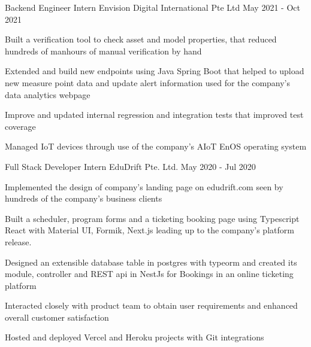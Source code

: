 

\begin{cventries}

  \cventry
    {Backend Engineer Intern} %
    {Envision Digital International Pte Ltd} %
    {} %
    {May 2021 - Oct 2021} %
    {
      \begin{cvitems} %
        \item {Built a verification tool to check asset and model properties, that reduced hundreds of manhours of manual verification by hand}
        \item {Extended and build new endpoints using Java Spring Boot that helped to upload new measure point data and update alert information used for the company's data analytics webpage}
        \item {Improve and updated internal regression and integration tests that improved test coverage}
        \item {Managed IoT devices through use of the company's AIoT EnOS operating system}
      \end{cvitems}
    }

  \cventry
    {Full Stack Developer Intern} %
    {EduDrift Pte. Ltd.} %
    {} %
    {May 2020 - Jul 2020} %
    {
      \begin{cvitems} %
        \item {Implemented the design of company's landing page on \textcolor{eduDft-darkblue}{edudrift.com} seen by hundreds of the company's business clients}
        \item {Built a scheduler, program forms and a ticketing booking page using Typescript React with Material UI, Formik, Next.js leading up to the company's platform release.}
        \item {Designed an extensible database table in postgres with typeorm and created its module, controller and REST api in NestJs for Bookings in an online ticketing platform}
        \item {Interacted closely with product team to obtain user requirements and enhanced overall customer satisfaction}
        \item {Hosted and deployed Vercel and Heroku projects with Git integrations}
      \end{cvitems}
    }

\end{cventries}

